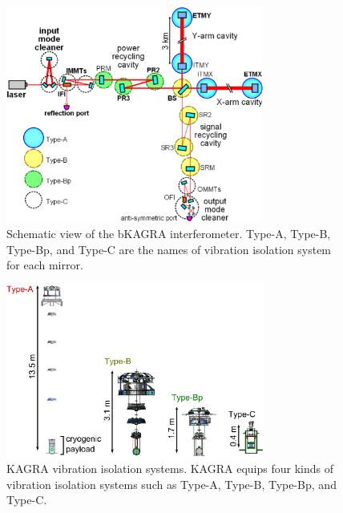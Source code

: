 \begin{figure}
\begin{center}
\includegraphics[width=8.5cm]{astrodiv/gw/overview/fig/kagra_config.eps}
\caption{Schematic view of the bKAGRA interferometer\cite{phase1_paper}. Type-A, Type-B, Type-Bp, and Type-C are the names of vibration isolation system for each mirror. }
\label{fig:config}
\end{center}
\end{figure}




\begin{figure}
\begin{center}
\includegraphics[width=8.5cm]{astrodiv/gw/overview/fig/suspensions.eps}
\caption{KAGRA vibration isolation systems\cite{phase1_paper}. KAGRA equips four kinds of vibration isolation systems such as Type-A, Type-B, Type-Bp, and Type-C.}
\label{fig:vis}
\end{center}
\end{figure}

